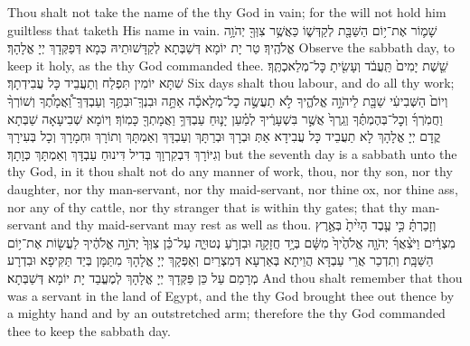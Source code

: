 {Thou shalt not take the name of the \lord\space thy God in vain; for the \lord\space will not hold him guiltless that taketh His name in vain.}{}
{שָׁמ֛וֹר אֶת־י֥וֹם הַשַּׁבָּ֖ת לְקַדְּשׁ֑וֹ כַּאֲשֶׁ֥ר צִוְּךָ֖ יְהֹוָ֥ה אֱלֹהֶֽיךָ׃}
{טַר יָת יוֹמָא דְּשַׁבְּתָא לְקַדָּשׁוּתֵיהּ כְּמָא דְּפַקְּדָךְ יְיָ אֱלָהָךְ׃}
{Observe the sabbath day, to keep it holy, as the \lord\space thy God commanded thee.}{}
{שֵׁ֤שֶׁת יָמִים֙ תַּֽעֲבֹ֔ד וְעָשִׂ֖יתָ כׇּל־מְלַאכְתֶּֽךָ׃}
{שִׁתָּא יוֹמִין תִּפְלַח וְתַעֲבֵיד כָּל עֲבִידְתָךְ׃}
{Six days shalt thou labour, and do all thy work;}{}
{וְיוֹם֙ הַשְּׁבִיעִ֔י שַׁבָּ֖ת לַיהֹוָ֣ה אֱלֹהֶ֑יךָ לֹ֣א תַעֲשֶׂ֣ה כׇל־מְלָאכָ֡ה אַתָּ֣ה וּבִנְךָֽ־וּבִתֶּ֣ךָ וְעַבְדְּךָֽ־וַ֠אֲמָתֶ֠ךָ וְשׁוֹרְךָ֨ וַחֲמֹֽרְךָ֜ וְכׇל־בְּהֶמְתֶּ֗ךָ וְגֵֽרְךָ֙ אֲשֶׁ֣ר בִּשְׁעָרֶ֔יךָ לְמַ֗עַן יָנ֛וּחַ עַבְדְּךָ֥ וַאֲמָתְךָ֖ כָּמֽוֹךָ׃}
{וְיוֹמָא שְׁבִיעָאָה שַׁבְּתָא קֳדָם יְיָ אֱלָהָךְ לָא תַעֲבֵיד כָּל עֲבִידָא אַתְּ וּבְרָךְ וּבְרַתָּךְ וְעַבְדָּךְ וְאַמְתָּךְ וְתוֹרָךְ וּחְמָרָךְ וְכָל בְּעִירָךְ וְגִיּוֹרָךְ דִּבְקִרְוָךְ בְּדִיל דִּינוּחַ עַבְדָּךְ וְאַמְתָּךְ כְּוָתָךְ׃}
{but the seventh day is a sabbath unto the \lord\space thy God, in it thou shalt not do any manner of work, thou, nor thy son, nor thy daughter, nor thy man-servant, nor thy maid-servant, nor thine ox, nor thine ass, nor any of thy cattle, nor thy stranger that is within thy gates; that thy man-servant and thy maid-servant may rest as well as thou.}{}
{וְזָכַרְתָּ֗ כִּ֣י עֶ֤בֶד הָיִ֙יתָ֙ בְּאֶ֣רֶץ מִצְרַ֔יִם וַיֹּצִ֨אֲךָ֜ יְהֹוָ֤ה אֱלֹהֶ֙יךָ֙ מִשָּׁ֔ם בְּיָ֥ד חֲזָקָ֖ה וּבִזְרֹ֣עַ נְטוּיָ֑ה עַל־כֵּ֗ן צִוְּךָ֙ יְהֹוָ֣ה אֱלֹהֶ֔יךָ לַעֲשׂ֖וֹת אֶת־י֥וֹם הַשַּׁבָּֽת׃\setuma}
{וְתִדְכַר אֲרֵי עַבְדָּא הֲוֵיתָא בְּאַרְעָא דְּמִצְרַיִם וְאַפְּקָךְ יְיָ אֱלָהָךְ מִתַּמָּן בְּיַד תַּקִּיפָא וּבִדְרָע מְרָמַם עַל כֵּן פַּקְּדָךְ יְיָ אֱלָהָךְ לְמֶעֱבַד יָת יוֹמָא דְּשַׁבְּתָא׃}
{And thou shalt remember that thou was a servant in the land of Egypt, and the \lord\space thy God brought thee out thence by a mighty hand and by an outstretched arm; therefore the \lord\space thy God commanded thee to keep the sabbath day.}{}
